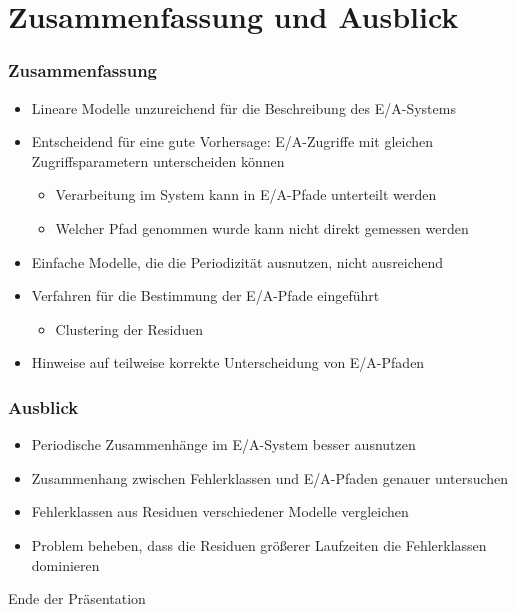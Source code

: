 \documentclass{beamer}
\begin{document}
\section{Zusammenfassung und Ausblick}
\begin{frame}
\frametitle{Zusammenfassung}
\begin{itemize}
	\item Lineare Modelle unzureichend für die Beschreibung des E/A-Systems
	\item Entscheidend für eine gute Vorhersage: E/A-Zugriffe mit gleichen Zugriffsparametern unterscheiden können
	\begin{itemize}
		\item Verarbeitung im System kann in E/A-Pfade unterteilt werden
		\item Welcher Pfad genommen wurde kann nicht direkt gemessen werden
	\end{itemize}
	\item Einfache Modelle, die die Periodizität ausnutzen, nicht ausreichend
	\item Verfahren für die Bestimmung der E/A-Pfade eingeführt
	\begin{itemize}
		\item Clustering der Residuen
	\end{itemize}
	\item Hinweise auf teilweise korrekte Unterscheidung von E/A-Pfaden
\end{itemize}	
\end{frame}

\begin{frame}
\frametitle{Ausblick}
\begin{itemize}
	\item Periodische Zusammenhänge im E/A-System besser ausnutzen
	\item Zusammenhang zwischen Fehlerklassen und E/A-Pfaden genauer untersuchen
	\item Fehlerklassen aus Residuen verschiedener Modelle vergleichen
	\item Problem beheben, dass die Residuen größerer Laufzeiten die Fehlerklassen dominieren
\end{itemize}	
\end{frame}

\begin{frame}
\Huge{\centerline{Ende der Präsentation}}
\end{frame}

\end{document}
